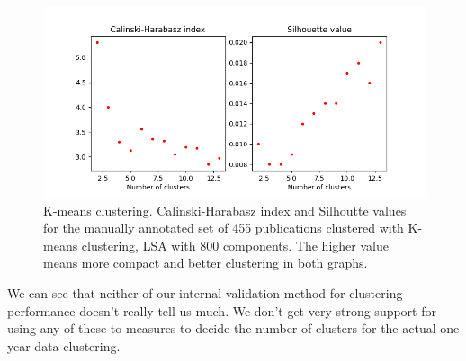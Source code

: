\begin{figure}[htp]
  \begin{center}    
\includegraphics[width=11.5cm]{images/c-h-silh-index-plot-455-2_12-800-kmeans.png}
    \caption{K-means clustering. Calinski-Harabasz index and Silhoutte values for the
    manually annotated set of 455 publications clustered with K-means 
    clustering, LSA with 800 components. The higher value means
    more compact and better clustering in both graphs.}
    \label{fig:ch-silh02}
  \end{center}
\end{figure}

We can see that neither of our internal validation method for 
clustering performance doesn't really tell us much. 
We don't get very strong support for using any of these to measures
to decide the number of clusters for the actual one year data 
clustering.



% 
% 

